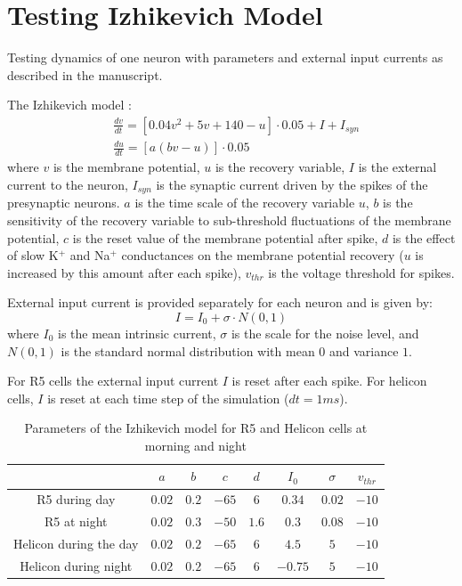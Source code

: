 \documentclass[../../report.tex]{subfiles}
\begin{document}
\section{Testing Izhikevich Model}

Testing dynamics of one neuron with parameters and external input currents as described in the manuscript.

The Izhikevich model \parencite{Izhikevich_2003}:
\begin{align}\label{eq_izhikevich_model}
    & \frac{dv}{dt} = \left[ 0.04v^2 + 5v + 140 - u \right] \cdot 0.05 + I + I_{syn} \\
    & \frac{du}{dt} = \left[ a (bv - u) \right] \cdot 0.05
\end{align}
where $v$ is the membrane potential, $u$ is the recovery variable, $I$ is the external current to the neuron, $I_{syn}$ is the synaptic current driven by the spikes of the presynaptic neurons. $a$ is the time scale of the recovery variable $u$, $b$ is the sensitivity of the recovery variable to sub-threshold fluctuations of the membrane potential, $c$ is the reset value of the membrane potential after spike, $d$ is the effect of slow K$^+$ and Na$^+$ conductances on the membrane potential recovery ($u$ is increased by this amount after each spike), $v_{thr}$ is the voltage threshold for spikes.

External input current is provided separately for each neuron and is given by:
\begin{equation}\label{eq_external_input_current}
    I = I_0 + \sigma \cdot N(0,1)
\end{equation}
where $I_0$ is the mean intrinsic current, $\sigma$ is the scale for the noise level, and $N(0,1)$ is the standard normal distribution with mean $0$ and variance $1$.

For R5 cells the external input current $I$ is reset after each spike. For helicon cells, $I$ is reset at each time step of the simulation ($dt=1ms$).

\begin{table}[!h]
    \centering
    \begin{tabular}{|c||c|c|c|c|c|c|c|}
        \hline
         & $a$ & $b$ & $c$ & $d$ & $I_0$ & $\sigma$ & $v_{thr}$ \\
         \hline
         \hline
        R5 during day & $0.02$ & $0.2$ & $-65$ & $6$ & $0.34$ & $0.02$ & $-10$ \\
        \hline
        R5 at night & $0.02$ & $0.3$ & $-50$ & $1.6$ & $0.3$ & $0.08$ & $-10$ \\
        \hline
        Helicon during the day & $0.02$ & $0.2$ & $-65$ & $6$ & $4.5$ & $5$ & $-10$ \\
        \hline
        Helicon during night & $0.02$ & $0.2$ & $-65$ & $6$ & $-0.75$ & $5$ & $-10$ \\
        \hline
    \end{tabular}
    \caption{Parameters of the Izhikevich model for R5 and Helicon cells at morning and night}
    \label{tab:my_label}
\end{table}
\end{document}
